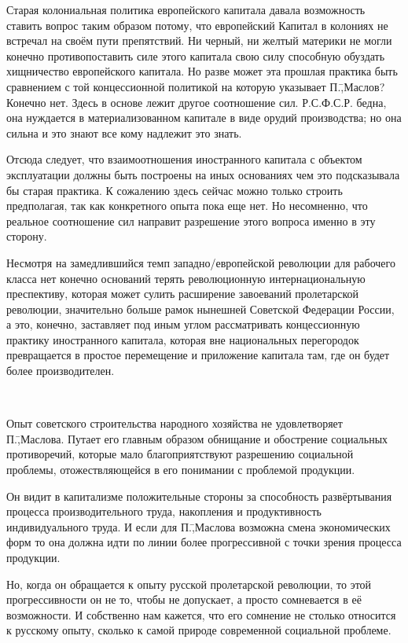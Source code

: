 Старая колониальная политика европейского капитала давала возможность ставить вопрос таким образом потому, что европейский Капитал в колониях не встречал на своём пути препятствий. Ни черный, ни желтый материки не могли конечно противопоставить силе этого капитала свою силу способную обуздать хищничество европейского капитала. Но разве может эта прошлая практика быть сравнением с той концессионной политикой на которую указывает П.\=,Маслов? Конечно нет. Здесь в основе лежит другое соотношение сил. Р.С.Ф.С.Р. бедна, она нуждается в материализованном капитале в виде орудий производства; но она сильна и это знают все кому надлежит это знать.

Отсюда следует, что взаимоотношения иностранного капитала с объектом эксплуатации должны быть построены на иных основаниях чем это подсказывала бы старая практика. К сожалению здесь сейчас можно только строить предполагая, так как конкретного опыта пока еще нет. Но несомненно, что реальное соотношение сил направит разрешение этого вопроса именно в эту сторону.

Несмотря на замедлившийся темп западно\-/европейской революции для рабочего класса нет конечно оснований терять революционную интернациональную преспективу, которая может сулить расширение завоеваний пролетарской революции, значительно больше рамок нынешней Советской Федерации России, а это, конечно, заставляет под иным углом рассматривать концессионную практику иностранного капитала, которая вне национальных перегородок превращается в простое перемещение и приложение капитала там, где он будет более производителен.

\begin{center}
 \noindent\textasteriskcentered\ \textasteriskcentered\ \textasteriskcentered
\end{center}

Опыт советского строительства народного хозяйства не удовлетворяет П.\=,Маслова. Путает его главным образом обнищание и обострение социальных противоречий, которые мало благоприятствуют разрешению социальной проблемы, отожествляющейся в его понимании с проблемой продукции.

Он видит в капитализме положительные стороны за способность развёртывания процесса производительного труда, накопления и продуктивность индивидуального труда. И если для П.\=,Маслова возможна смена экономических форм то она должна идти по линии более прогрессивной с точки зрения процесса продукции.

Но, когда он обращается к опыту русской пролетарской революции, то этой прогрессивности он не то, чтобы не допускает, а просто сомневается в её возможности. И собственно нам кажется, что его сомнение не столько относится к русскому опыту, сколько к самой природе современной социальной проблеме.

